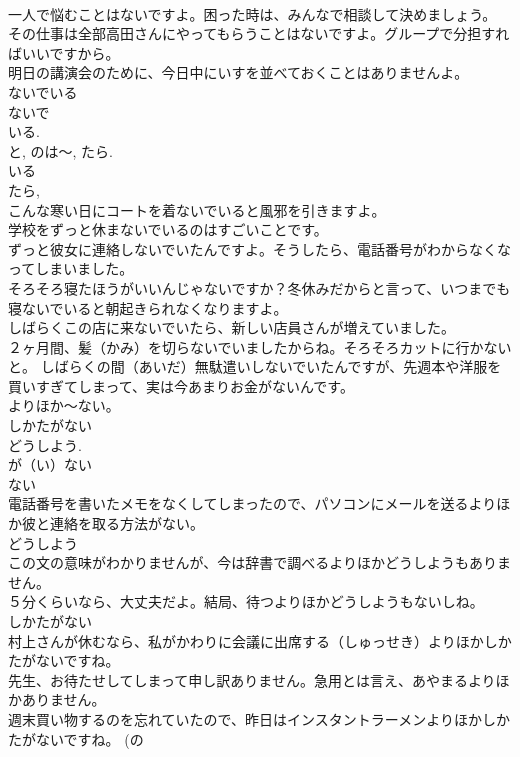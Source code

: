 \documentclass[8pt]{extreport}
\begin{document}
\begin{CJK}{UTF8}{min}
\\	一人で悩むことはないですよ。困った時は、みんなで相談して決めましょう。 
\\	その仕事は全部高田さんにやってもらうことはないですよ。グループで分担すればいいですから。 
\\	明日の講演会のために、今日中にいすを並べておくことはありませんよ。 
\\	ないでいる	
\\	ないで 
\\	いる. 
\\	と, のは～, たら. 
\\	いる 
\\	たら, 
\\	こんな寒い日にコートを着ないでいると風邪を引きますよ。 
\\	学校をずっと休まないでいるのはすごいことです。 
\\	ずっと彼女に連絡しないでいたんですよ。そうしたら、電話番号がわからなくなってしまいました。 
\\	そろそろ寝たほうがいいんじゃないですか？冬休みだからと言って、いつまでも寝ないでいると朝起きられなくなりますよ。 
\\	しばらくこの店に来ないでいたら、新しい店員さんが増えていました。 
\\	２ヶ月間、髪（かみ）を切らないでいましたからね。そろそろカットに行かないと。 しばらくの間（あいだ）無駄遣いしないでいたんですが、先週本や洋服を買いすぎてしまって、実は今あまりお金がないんです。
\\	よりほか～ない。	
\\	しかたがない 
\\	どうしよう. 
\\	が（い）ない 
\\	ない 
\\	電話番号を書いたメモをなくしてしまったので、パソコンにメールを送るよりほか彼と連絡を取る方法がない。 
\\	どうしよう 
\\	この文の意味がわかりませんが、今は辞書で調べるよりほかどうしようもありません。 
\\	５分くらいなら、大丈夫だよ。結局、待つよりほかどうしようもないしね。 
\\	しかたがない 
\\	村上さんが休むなら、私がかわりに会議に出席する（しゅっせき）よりほかしかたがないですね。 
\\	先生、お待たせしてしまって申し訳ありません。急用とは言え、あやまるよりほかありません。　
\\	週末買い物するのを忘れていたので、昨日はインスタントラーメンよりほかしかたがないですね。 (の 

\end{CJK}
\end{document}
